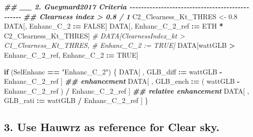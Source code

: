 \documentclass[
  10pt,
  a4paper,oneside]{article}
\newenvironment{Shaded}{\begin{snugshade}}{\end{snugshade}}
\newcommand{\CommentTok}[1]{\textcolor[rgb]{0.56,0.35,0.01}{\textit{#1}}}
\newcommand{\ConstantTok}[1]{\textcolor[rgb]{0.56,0.35,0.01}{#1}}
\newcommand{\ControlFlowTok}[1]{\textcolor[rgb]{0.13,0.29,0.53}{\textbf{#1}}}
\newcommand{\DocumentationTok}[1]{\textcolor[rgb]{0.56,0.35,0.01}{\textbf{\textit{#1}}}}
\newcommand{\FloatTok}[1]{\textcolor[rgb]{0.00,0.00,0.81}{#1}}
\newcommand{\NormalTok}[1]{#1}
\newcommand{\OtherTok}[1]{\textcolor[rgb]{0.56,0.35,0.01}{#1}}
\newcommand{\SpecialCharTok}[1]{\textcolor[rgb]{0.81,0.36,0.00}{\textbf{#1}}}
\newcommand{\StringTok}[1]{\textcolor[rgb]{0.31,0.60,0.02}{#1}}
\begin{document}
\begin{Shaded}
\begin{Highlighting}[]
\DocumentationTok{\#\# \_\_ 2. Gueymard2017 Criteria  {-}{-}{-}{-}{-}{-}{-}{-}{-}{-}{-}{-}{-}{-}{-}{-}{-}{-}{-}{-}{-}{-}{-}{-}{-}{-}{-}{-}{-}{-}{-}{-}{-}{-}{-}{-}{-}{-}{-}{-}{-}{-}{-}{-}{-}{-}{-}{-}}
\DocumentationTok{\#\# Clearness index \textgreater{} 0.8 / 1}
\NormalTok{C2\_Clearness\_Kt\_THRES }\OtherTok{\textless{}{-}} \FloatTok{0.8}
\NormalTok{DATA[, Enhanc\_C\_2 }\SpecialCharTok{:=} \ConstantTok{FALSE}\NormalTok{]}
\NormalTok{DATA[, Enhanc\_C\_2\_ref }\SpecialCharTok{:=}\NormalTok{ ETH }\SpecialCharTok{*}\NormalTok{ C2\_Clearness\_Kt\_THRES]}
\CommentTok{\# DATA[ClearnessIndex\_kt \textgreater{} C1\_Clearness\_Kt\_THRES,}
\CommentTok{\#      Enhanc\_C\_2 := TRUE]}
\NormalTok{DATA[wattGLB }\SpecialCharTok{\textgreater{}}\NormalTok{ Enhanc\_C\_2\_ref,}
\NormalTok{     Enhanc\_C\_2 }\SpecialCharTok{:=} \ConstantTok{TRUE}\NormalTok{]}

\ControlFlowTok{if}\NormalTok{ (SelEnhanc }\SpecialCharTok{==} \StringTok{"Enhanc\_C\_2"}\NormalTok{) \{}
\NormalTok{    DATA[ , GLB\_diff }\SpecialCharTok{:=}\NormalTok{   wattGLB }\SpecialCharTok{{-}}\NormalTok{ Enhanc\_C\_2\_ref                    ] }\DocumentationTok{\#\# enhancement}
\NormalTok{    DATA[ , GLB\_ench }\SpecialCharTok{:=}\NormalTok{ ( wattGLB }\SpecialCharTok{{-}}\NormalTok{ Enhanc\_C\_2\_ref ) }\SpecialCharTok{/}\NormalTok{ Enhanc\_C\_2\_ref ] }\DocumentationTok{\#\# relative enhancement}
\NormalTok{    DATA[ , GLB\_rati }\SpecialCharTok{:=}\NormalTok{   wattGLB }\SpecialCharTok{/}\NormalTok{ Enhanc\_C\_2\_ref                    ]}
\NormalTok{\}}
\end{Highlighting}
\end{Shaded}

\hypertarget{use-hauwrz-as-reference-for-clear-sky.}{%
\subsection{3. Use Hauwrz as reference for Clear sky.}\label{use-hauwrz-as-reference-for-clear-sky.}}
\end{document}
